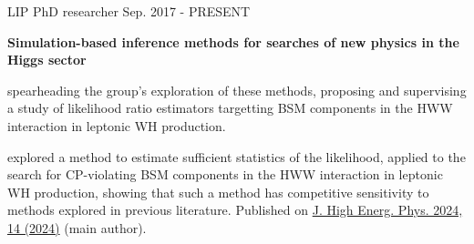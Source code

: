 
\begin{cventries}

    \cventry
    {LIP}
    {PhD researcher}
    {}
    {Sep. 2017 - PRESENT}
    {
        \textbf{Simulation-based inference methods for searches of new physics in the Higgs sector}\vspace{12pt}
        \begin{cvitems}      
            \item {spearheading the group's exploration of these methods, proposing and supervising a study of likelihood ratio estimators targetting BSM components in the HWW interaction in leptonic WH production.}
            \item {explored a method to estimate sufficient statistics of the likelihood, applied to the search for CP-violating BSM components in the HWW interaction in leptonic WH production, showing that such a method has competitive sensitivity to methods explored in previous literature. Published on \href{https://doi.org/10.1007/JHEP04(2024)014}{J. High Energ. Phys. 2024, 14 (2024)} (main author).}
        \end{cvitems}
    }


\end{cventries}
